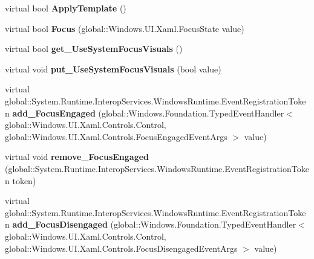 \begin{DoxyCompactItemize}
\item 
\mbox{\label{class_windows_1_1_u_i_1_1_xaml_1_1_controls_1_1_control_acdc49d1356465906f233a94118f9fc61}} 
virtual bool {\bfseries Apply\+Template} ()
\item 
\mbox{\label{class_windows_1_1_u_i_1_1_xaml_1_1_controls_1_1_control_af09f0101a93f914e3ea713e2afd6cbc5}} 
virtual bool {\bfseries Focus} (global\+::\+Windows.\+U\+I.\+Xaml.\+Focus\+State value)
\item 
\mbox{\label{class_windows_1_1_u_i_1_1_xaml_1_1_controls_1_1_control_a1f599dcf33ab7480ed9700961d478ab9}} 
virtual bool {\bfseries get\+\_\+\+Use\+System\+Focus\+Visuals} ()
\item 
\mbox{\label{class_windows_1_1_u_i_1_1_xaml_1_1_controls_1_1_control_a47ca9e1b055dc27a0c37edbc47e2540d}} 
virtual void {\bfseries put\+\_\+\+Use\+System\+Focus\+Visuals} (bool value)
\item 
\mbox{\label{class_windows_1_1_u_i_1_1_xaml_1_1_controls_1_1_control_a25b5c6642d47212aa2e63ff6200ac1c7}} 
virtual global\+::\+System.\+Runtime.\+Interop\+Services.\+Windows\+Runtime.\+Event\+Registration\+Token {\bfseries add\+\_\+\+Focus\+Engaged} (global\+::\+Windows.\+Foundation.\+Typed\+Event\+Handler$<$ global\+::\+Windows.\+U\+I.\+Xaml.\+Controls.\+Control, global\+::\+Windows.\+U\+I.\+Xaml.\+Controls.\+Focus\+Engaged\+Event\+Args $>$ value)
\item 
\mbox{\label{class_windows_1_1_u_i_1_1_xaml_1_1_controls_1_1_control_aae2dfe22e085e480a19bdb599b17d9bb}} 
virtual void {\bfseries remove\+\_\+\+Focus\+Engaged} (global\+::\+System.\+Runtime.\+Interop\+Services.\+Windows\+Runtime.\+Event\+Registration\+Token token)
\item 
\mbox{\label{class_windows_1_1_u_i_1_1_xaml_1_1_controls_1_1_control_a37520b52e70f32ebd8cf57ee3b584dcf}} 
virtual global\+::\+System.\+Runtime.\+Interop\+Services.\+Windows\+Runtime.\+Event\+Registration\+Token {\bfseries add\+\_\+\+Focus\+Disengaged} (global\+::\+Windows.\+Foundation.\+Typed\+Event\+Handler$<$ global\+::\+Windows.\+U\+I.\+Xaml.\+Controls.\+Control, global\+::\+Windows.\+U\+I.\+Xaml.\+Controls.\+Focus\+Disengaged\+Event\+Args $>$ value)

\end{DoxyCompactItemize}
